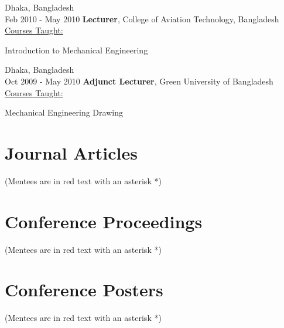 \documentclass[11pt, letterpaper]{article}
\begin{document}
    \begin{twocolentry}{
       Dhaka, Bangladesh\\
        Feb 2010 - May 2010
    }
        \textbf{Lecturer}, College of Aviation Technology, Bangladesh\\
        \uline{Courses Taught:} 
            \begin{highlightsforbulletentries}
                \item Introduction to Mechanical Engineering
            \end{highlightsforbulletentries}
    \end{twocolentry}
    \vspace{5 pt}

        \begin{twocolentry}{
       Dhaka, Bangladesh\\
        Oct 2009 - May 2010
    }
        \textbf{Adjunct Lecturer}, Green University of Bangladesh\\
        \uline{Courses Taught:} 
            \begin{highlightsforbulletentries}
                \item Mechanical Engineering Drawing
            \end{highlightsforbulletentries}
    \end{twocolentry}
    \vspace{5 pt}

\section{Journal Articles}
(Mentees are in red text with an asterisk *)
\nocite{*}
\begin{refcontext}[labelprefix=J]
    \printbibliography[heading=none, type=article, title={Journal Articles}]
\end{refcontext}

\section{Conference Proceedings}
(Mentees are in red text with an asterisk *)
\nocite{*}
\begin{refcontext}[labelprefix=C]
    \printbibliography[heading=none, type=inproceedings, sorting=pubdate, title={Conference Papers}]
\end{refcontext}

\section{Conference Posters}
(Mentees are in red text with an asterisk *)
\nocite{*}
\begin{refcontext}[labelprefix=P]
    \printbibliography[heading=none, type=misc, keyword=poster, title={Posters}]
\end{refcontext}
\end{document}
